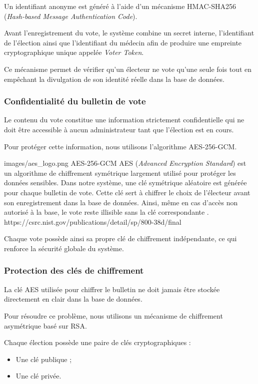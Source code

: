 ﻿\documentclass[12pt,a4paper]{report}
\begin{document}
Un identifiant anonyme est généré à l’aide d’un mécanisme HMAC-SHA256
(\textit{Hash-based Message Authentication Code}).

Avant l’enregistrement du vote, le système combine un secret interne, l’identifiant
de l’élection ainsi que l’identifiant du médecin afin de produire une empreinte
cryptographique unique appelée \textit{Voter Token}.

Ce mécanisme permet de vérifier qu’un électeur ne vote qu’une seule fois tout
en empêchant la divulgation de son identité réelle dans la base de données.

\subsubsection{Confidentialité du bulletin de vote}

Le contenu du vote constitue une information strictement confidentielle qui ne
doit être accessible à aucun administrateur tant que l’élection est en cours.

Pour protéger cette information, nous utilisons l’algorithme AES-256-GCM.

\techno
{images/aes_logo.png}
{AES-256-GCM}
{AES (\textit{Advanced Encryption Standard}) est un algorithme de chiffrement
symétrique largement utilisé pour protéger les données sensibles. Dans notre
système, une clé symétrique aléatoire est générée pour chaque bulletin de vote.
Cette clé sert à chiffrer le choix de l’électeur avant son enregistrement dans
la base de données. Ainsi, même en cas d’accès non autorisé à la base, le vote
reste illisible sans la clé correspondante \cite{nistAesGcm}.}
{https://csrc.nist.gov/publications/detail/sp/800-38d/final}

Chaque vote possède ainsi sa propre clé de chiffrement indépendante, ce qui
renforce la sécurité globale du système.

\subsubsection{Protection des clés de chiffrement}

La clé AES utilisée pour chiffrer le bulletin ne doit jamais être stockée
directement en clair dans la base de données.

Pour résoudre ce problème, nous utilisons un mécanisme de chiffrement
asymétrique basé sur RSA.

Chaque élection possède une paire de clés cryptographiques :

\begin{itemize}
\item Une clé publique ;
\item Une clé privée.
\end{itemize}
\end{document}
